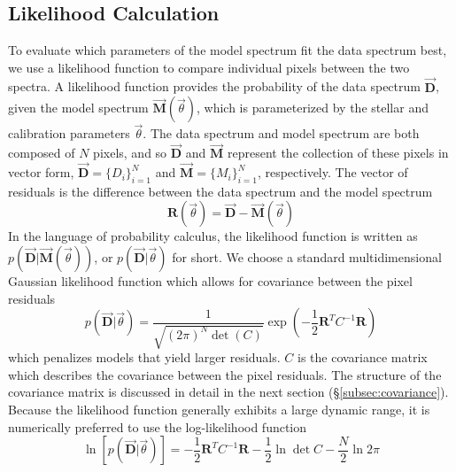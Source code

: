 \documentclass[preprint]{aastex} %
\newcommand{\vt}{\vec{\theta}}
\newcommand{\fM}{ \vec{{\bm M}}}
\newcommand{\fMi}{M_i}
\newcommand{\fD}{ \vec{{\bm D}}}
\newcommand{\fDi}{D_i}
\newcommand{\fR}{ {\bm R}}
\begin{document}
\subsection{Likelihood Calculation}
\label{subsec:likelihood}

To evaluate which parameters of the model spectrum fit the data spectrum best,
we use a likelihood function to compare individual pixels between the two
spectra. A likelihood function provides the probability of the data spectrum
$\fD$, given the model spectrum $\fM(\vt)$, which is parameterized by the
stellar and calibration parameters $\vt$. The data spectrum and model spectrum are both composed of $N$ pixels, and so $\fD$ and $\fM$ represent the collection of these pixels in vector form, 
$\fD = \{\fDi\}^N_{i=1}$ and $\fM = \{\fMi\}^N_{i=1} $, respectively. The vector of residuals is the difference between the data spectrum and the model spectrum
\begin{equation}
  \fR(\vt) = \fD - \fM(\vt)
\end{equation}
In the language of probability calculus, the likelihood function is written as
$p(\fD | \fM(\vt))$, or $p(\fD | \vt)$ for short. We choose a standard
multidimensional Gaussian likelihood function which allows for covariance
between the pixel residuals 
\begin{equation}
  p(\fD | \vt) = \frac{1}{\sqrt{(2 \pi)^N \det(C)}} \exp\left ( -\frac{1}{2}
   \fR^T C^{-1} \fR \right ) 
   \label{eqn:prob}
\end{equation}
which penalizes models that yield larger residuals. $C$ is the covariance
matrix which describes the covariance between the pixel residuals. The structure of the covariance matrix is discussed in detail in the next section (\S\ref{subsec:covariance}). Because
the likelihood function generally exhibits a large dynamic range, it is numerically
preferred to use the log-likelihood function
\begin{equation}
  \ln[p(\fD | \vt)] = -\frac{1}{2} \fR^T C^{-1} \fR - \frac{1}{2} \ln \det C  
   - \frac{N}{2} \ln 2 \pi 
  \label{eqn:lnprob}
\end{equation}
\end{document}
